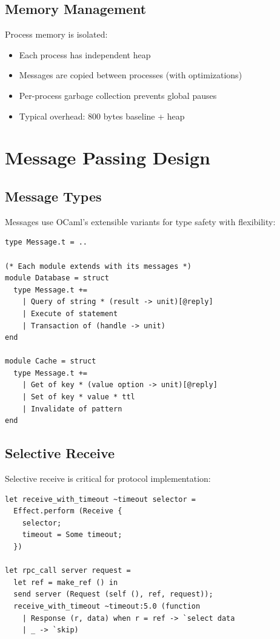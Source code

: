 \documentclass[12pt,a4paper]{report}
\begin{document}
\subsection{Memory Management}

Process memory is isolated:
\begin{itemize}
\item Each process has independent heap
\item Messages are copied between processes (with optimizations)
\item Per-process garbage collection prevents global pauses
\item Typical overhead: 800 bytes baseline + heap
\end{itemize}

\section{Message Passing Design}

\subsection{Message Types}

Messages use OCaml's extensible variants for type safety with flexibility:

\begin{lstlisting}
type Message.t = ..

(* Each module extends with its messages *)
module Database = struct
  type Message.t +=
    | Query of string * (result -> unit)[@reply]
    | Execute of statement
    | Transaction of (handle -> unit)
end

module Cache = struct  
  type Message.t +=
    | Get of key * (value option -> unit)[@reply]
    | Set of key * value * ttl
    | Invalidate of pattern
end
\end{lstlisting}

\subsection{Selective Receive}

Selective receive is critical for protocol implementation:

\begin{lstlisting}
let receive_with_timeout ~timeout selector =
  Effect.perform (Receive {
    selector;
    timeout = Some timeout;
  })

let rpc_call server request =
  let ref = make_ref () in
  send server (Request (self (), ref, request));
  receive_with_timeout ~timeout:5.0 (function
    | Response (r, data) when r = ref -> `select data
    | _ -> `skip)
\end{lstlisting}
\end{document}
